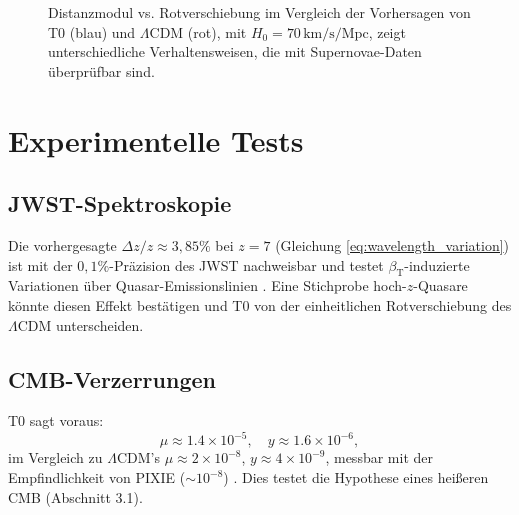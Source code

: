 \documentclass[12pt,a4paper]{article}
\newcommand{\betaT}{\beta_{\text{T}}}
\begin{document}
	\begin{figure}[ht]
		\centering
		\caption{Distanzmodul vs. Rotverschiebung im Vergleich der Vorhersagen von T0 (blau) und \(\Lambda\)CDM (rot), mit \(H_0 = 70 \, \text{km/s/Mpc}\), zeigt unterschiedliche Verhaltensweisen, die mit Supernovae-Daten überprüfbar sind.}
		\label{fig:distance_modulus}
	\end{figure}
	
	\section{Experimentelle Tests}
	\label{sec:tests}
	
	\subsection{JWST-Spektroskopie}
	\label{subsec:jwst_test}
	
	Die vorhergesagte \(\Delta z / z \approx 3,85\%\) bei \(z = 7\) (Gleichung \ref{eq:wavelength_variation}) ist mit der \(0,1\%\)-Präzision des JWST nachweisbar und testet \(\betaT\)-induzierte Variationen über Quasar-Emissionslinien \cite{pascher_params_2025}. Eine Stichprobe hoch-\(z\)-Quasare könnte diesen Effekt bestätigen und T0 von der einheitlichen Rotverschiebung des \(\Lambda\)CDM unterscheiden.
	
	\subsection{CMB-Verzerrungen}
	\label{subsec:cmb_distortions_test}
	
	T0 sagt voraus:
	\begin{equation}
		\mu \approx 1.4 \times 10^{-5}, \quad y \approx 1.6 \times 10^{-6},
		\label{eq:distortion_parameters}
	\end{equation}
	im Vergleich zu \(\Lambda\)CDM’s \(\mu \approx 2 \times 10^{-8}\), \(y \approx 4 \times 10^{-9}\), messbar mit der Empfindlichkeit von PIXIE (\(\sim 10^{-8}\)) \cite{pascher_temp_2025}. Dies testet die Hypothese eines heißeren CMB (Abschnitt 3.1).
	
\end{document}
